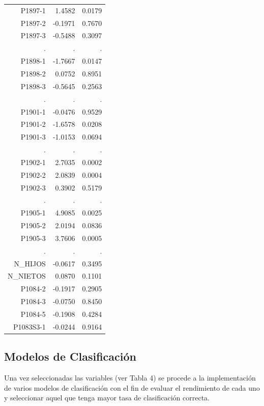\documentclass[11pt,twoside]{article}
\begin{document}
\begin{table}[H]
\begin{tabular}{rrr}
		P1897-1 & 1.4582 & 0.0179 \\ 
		P1897-2 & -0.1971 &  0.7670 \\ 
		P1897-3 & -0.5488 & 0.3097 \\ 
		. & . &  . \\ 
		P1898-1 & -1.7667 &  0.0147 \\ 
		P1898-2 & 0.0752 &  0.8951 \\ 
		P1898-3 & -0.5645 &  0.2563 \\ 
		. & . &  . \\ 
		P1901-1 & -0.0476 &  0.9529 \\ 
		P1901-2 & -1.6578 &  0.0208 \\ 
		P1901-3 & -1.0153 &  0.0694 \\ 
		. & . &  . \\ 
		P1902-1 & 2.7035 &  0.0002 \\ 
		P1902-2 & 2.0839 &  0.0004 \\ 
		P1902-3 & 0.3902 &  0.5179 \\ 
		. & . &  . \\ 
		P1905-1 & 4.9085 &  0.0025 \\ 
		P1905-2 & 2.0194 &  0.0836 \\ 
		P1905-3 & 3.7606 & 0.0005 \\ 
		. & . &  . \\ 
		N\_HIJOS & -0.0617 & 0.3495 \\ 
		N\_NIETOS & 0.0870 & 0.1101 \\ 
		P1084-2 & -0.1917 &  0.2905 \\ 
		P1084-3 & -0.0750 &  0.8450 \\ 
		P1084-5 & -0.1908 &  0.4284 \\ 
		P1083S3-1 & -0.0244 &  0.9164 \\ 
		\hline
	\end{tabular}
\end{table}




\noindent
\subsection*{Modelos de Clasificación}
 \noindent
Una vez seleccionadas las variables (ver Tabla 4) se procede a la implementación de varios modelos de clasificación con el fin de evaluar el rendimiento de cada uno y seleccionar aquel que tenga mayor tasa de clasificación correcta. 
\end{document}
